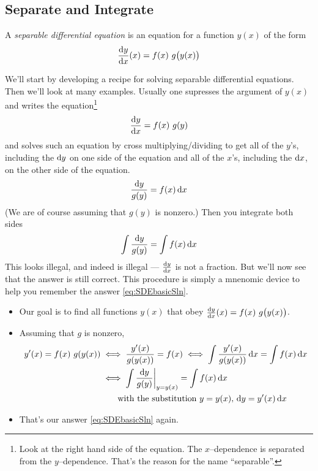 \subsection{Separate and Integrate}

\begin{defn}\label{def:SDEsepdiffeq}
A \emph{separable differential equation} is an equation for a function
$y(x)$ of the form
\begin{equation*}
\diff{y}{x}(x) = f(x)\ g\big(y(x)\big)
\end{equation*}
\end{defn}

We'll start by developing a recipe for solving separable differential
equations. Then we'll look at many examples.
Usually one supresses the argument of $y(x)$  and writes the
equation\footnote{Look at the right hand side of the equation.
The $x$--dependence is separated from the $y$--dependence. That's
the reason for the name ``separable''.}
\begin{equation*}
\diff{y}{x} = f(x)\ g(y)
\end{equation*}
and solves such an equation by cross multiplying/dividing
to get all of the $y$'s, including the $\mathrm{d}y$ on one side of
the equation and all of the $x$'s, including the $\mathrm{d}x$, on the
other side of the equation.
\begin{equation*}
\frac{\mathrm{d}y}{g(y)}=f(x)\,\mathrm{d}x
\end{equation*}
(We are of course assuming that $g(y)$ is nonzero.)
Then you integrate both sides
\begin{equation}\label{eq:SDEbasicSln}
\int\frac{\mathrm{d}y}{g(y)}=\int f(x)\,\mathrm{d}x
\end{equation}
This looks illegal, and indeed is illegal --- $\diff{y}{x}$ is not a fraction.
But we'll now see that the answer is still correct. This procedure is simply
a mnenomic device to help you remember the answer \eqref{eq:SDEbasicSln}.
\begin{itemize}
\item
Our goal is to find all functions $y(x)$ that obey
$
\diff{y}{x}(x) = f(x)\ g\big(y(x)\big)
$.
\item
Assuming that $g$ is nonzero,
\begin{align*}
y'(x) = f(x)\ g(y(x))
&\iff \frac{y'(x)}{g(y(x))}=f(x)
\iff \int\frac{y'(x)}{g(y(x))}\,\mathrm{d}x= \int f(x)\,\mathrm{d}x \\
&\iff \int\frac{\mathrm{d}y}{g(y)}\bigg|_{y=y(x)}= \int f(x)\,\mathrm{d}x \\
&\qquad \text{with the substitution $y=y(x)$, $\mathrm{d}y = y'(x)\,\mathrm{d}x$}
\end{align*}
\item
That's our answer \eqref{eq:SDEbasicSln} again.
\end{itemize}


